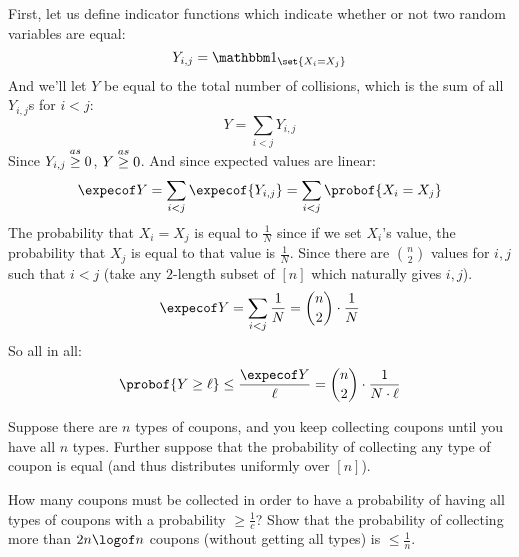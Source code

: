\begin{solution}

	First, let us define indicator functions which indicate whether or not two random variables are equal:
	\[ Y_{i,j} = \bone_{\set{X_i=X_j}} \]
	And we'll let $Y$ be equal to the total number of collisions, which is the sum of all $Y_{i,j}$s for $i<j$:
	\[ Y = \sum_{i<j} Y_{i,j} \]
	Since $Y_{i,j}\mathrel{\overset{as}\geq} 0$, $Y\mathrel{\overset{as}\geq} 0$.
	And since expected values are linear:
	\[ \expecof Y = \sum_{i<j}\expecof{Y_{i,j}} = \sum_{i<j}\probof{X_i=X_j} \]
	The probability that $X_i=X_j$ is equal to $\frac1N$ since if we set $X_i$'s value, the probability that $X_j$
	is equal to that value is $\frac1N$.
	Since there are $\binom n2$ values for $i,j$ such that $i<j$ (take any $2$-length subset of $[n]$ which
	naturally gives $i,j$).
	\[ \expecof Y = \sum_{i<j}\frac1N = \binom n2\cdot\frac1N \]
	So all in all:
	\[ \probof{Y\geq\ell} \leq \frac{\expecof Y}\ell = \binom n2\cdot\frac1{N\cdot\ell} \]

\end{solution}

\begin{exercise}

	Suppose there are $n$ types of coupons, and you keep collecting coupons until you have all $n$ types.
	Further suppose that the probability of collecting any type of coupon is equal (and thus distributes
	uniformly over $[n]$).
	\begin{msecenumerate}
		\mitem How many coupons must be collected in order to have a probability of having all types of coupons
			with a probability $\geq\frac1c$?
		\mitem Show that the probability of collecting more than $2n\logof n$ coupons (without getting all types)
			is $\leq\frac1n$.
	\end{msecenumerate}

\end{exercise}

